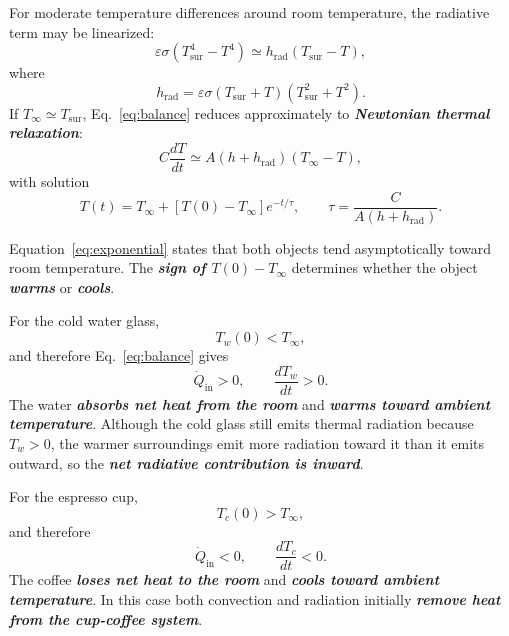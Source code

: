 \documentclass[11pt]{article}
\begin{document}
For moderate temperature differences around room temperature, the radiative term may be linearized:
\begin{equation}
    \varepsilon\sigma\left(T_{\mathrm{sur}}^4-T^4\right)
    \simeq h_{\mathrm{rad}}\left(T_{\mathrm{sur}}-T\right),
\end{equation}
where
\begin{equation}
    h_{\mathrm{rad}}
    = \varepsilon\sigma\left(T_{\mathrm{sur}}+T\right)
    \left(T_{\mathrm{sur}}^2+T^2\right).
\end{equation}
If $T_{\infty}\simeq T_{\mathrm{sur}}$, Eq.~\eqref{eq:balance} reduces approximately to \textbf{\textit{Newtonian thermal relaxation}}:
\begin{equation}
    C\frac{dT}{dt}
    \simeq A\left(h+h_{\mathrm{rad}}\right)\left(T_{\infty}-T\right),
\end{equation}
with solution
\begin{equation}
    T(t) = T_{\infty} + \left[T(0)-T_{\infty}\right]e^{-t/\tau},
    \qquad
    \tau = \frac{C}{A\left(h+h_{\mathrm{rad}}\right)}.
    \label{eq:exponential}
\end{equation}

Equation~\eqref{eq:exponential} states that both objects tend asymptotically toward room temperature. The \textbf{\textit{sign of $T(0)-T_{\infty}$}} determines whether the object \textbf{\textit{warms}} or \textbf{\textit{cools}}.

For the cold water glass,
\begin{equation}
    T_w(0)<T_{\infty},
\end{equation}
and therefore Eq.~\eqref{eq:balance} gives
\begin{equation}
    \dot Q_{\mathrm{in}}>0,
    \qquad
    \frac{dT_w}{dt}>0.
\end{equation}
The water \textbf{\textit{absorbs net heat from the room}} and \textbf{\textit{warms toward ambient temperature}}. Although the cold glass still emits thermal radiation because $T_w>0$, the warmer surroundings emit more radiation toward it than it emits outward, so the \textbf{\textit{net radiative contribution is inward}}.

For the espresso cup,
\begin{equation}
    T_c(0)>T_{\infty},
\end{equation}
and therefore
\begin{equation}
    \dot Q_{\mathrm{in}}<0,
    \qquad
    \frac{dT_c}{dt}<0.
\end{equation}
The coffee \textbf{\textit{loses net heat to the room}} and \textbf{\textit{cools toward ambient temperature}}. In this case both convection and radiation initially \textbf{\textit{remove heat from the cup-coffee system}}.
\end{document}

